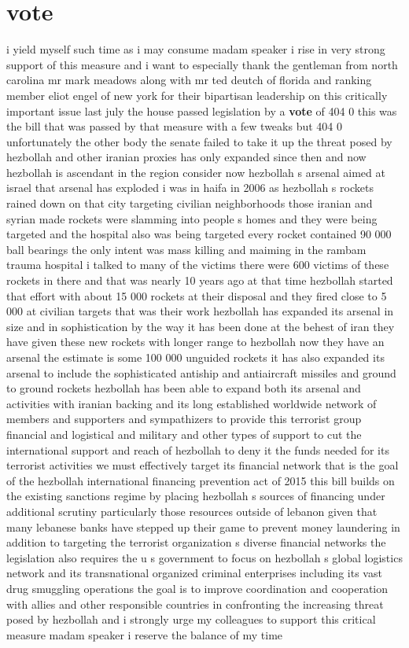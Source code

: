 \documentclass{article}
\begin{document}
\section*{vote}
i yield myself such time as i may consume madam speaker i rise in very strong support of this measure and i want to especially thank the gentleman from north carolina mr mark meadows along with mr ted deutch of florida and ranking member eliot engel of new york for their bipartisan leadership on this critically important issue last july the house passed legislation by a {\bf \color{red} vote} of 404 0 this was the bill that was passed by that measure with a few tweaks but 404 0 unfortunately the other body the senate failed to take it up the threat posed by hezbollah and other iranian proxies has only expanded since then and now hezbollah is ascendant in the region consider now hezbollah s arsenal aimed at israel that arsenal has exploded i was in haifa in 2006 as hezbollah s rockets rained down on that city targeting civilian neighborhoods those iranian and syrian made rockets were slamming into people s homes and they were being targeted and the hospital also was being targeted every rocket contained 90 000 ball bearings the only intent was mass killing and maiming in the rambam trauma hospital i talked to many of the victims there were 600 victims of these rockets in there and that was nearly 10 years ago at that time hezbollah started that effort with about 15 000 rockets at their disposal and they fired close to 5 000 at civilian targets that was their work hezbollah has expanded its arsenal in size and in sophistication by the way it has been done at the behest of iran they have given these new rockets with longer range to hezbollah now they have an arsenal the estimate is some 100 000 unguided rockets it has also expanded its arsenal to include the sophisticated antiship and antiaircraft missiles and ground to ground rockets hezbollah has been able to expand both its arsenal and activities with iranian backing and its long established worldwide network of members and supporters and sympathizers to provide this terrorist group financial and logistical and military and other types of support to cut the international support and reach of hezbollah to deny it the funds needed for its terrorist activities we must effectively target its financial network that is the goal of the hezbollah international financing prevention act of 2015 this bill builds on the existing sanctions regime by placing hezbollah s sources of financing under additional scrutiny particularly those resources outside of lebanon given that many lebanese banks have stepped up their game to prevent money laundering in addition to targeting the terrorist organization s diverse financial networks the legislation also requires the u s government to focus on hezbollah s global logistics network and its transnational organized criminal enterprises including its vast drug smuggling operations the goal is to improve coordination and cooperation with allies and other responsible countries in confronting the increasing threat posed by hezbollah and i strongly urge my colleagues to support this critical measure madam speaker i reserve the balance of my time
\end{document}
